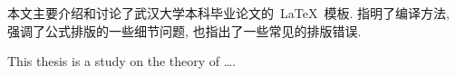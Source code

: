\begin{cnabstract}
    本文主要介绍和讨论了武汉大学本科毕业论文的~\LaTeX~模板.
    指明了编译方法, 强调了公式排版的一些细节问题, 也指出了一些常见的排版错误.
\end{cnabstract}



\begin{enabstract}
This thesis is a study on the theory of \dots.

\end{enabstract}
